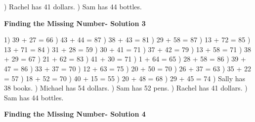 \documentclass{article}%
\begin{document}
) Rachel has 41 dollars.%
) Sam has 44 bottles.%
\newline%
\newpage%
\large%
\begin{center}%
\textbf{Finding the Missing Number- Solution 3}%
\newline%
\end{center} \normalsize%
1) 39 + 27 = 66%
) 43 + 44 = 87%
) 38 + 43 = 81%
) 29 + 58 = 87%
) 13 + 72 = 85%
) 13 + 71 = 84%
) 31 + 28 = 59%
) 30 + 41 = 71%
) 37 + 42 = 79%
) 13 + 58 = 71%
) 38 + 29 = 67%
) 21 + 62 = 83%
) 41 + 30 = 71%
) 1 + 64 = 65%
) 28 + 58 = 86%
) 39 + 47 = 86%
) 33 + 37 = 70%
) 12 + 63 = 75%
) 20 + 50 = 70%
) 26 + 37 = 63%
) 35 + 22 = 57%
) 18 + 52 = 70%
) 40 + 15 = 55%
) 20 + 48 = 68%
) 29 + 45 = 74%
) Sally has 38 books.%
) Michael has 54 dollars.%
) Sam has 52 pens.%
) Rachel has 41 dollars.%
) Sam has 44 bottles.%
\newline%
\newpage%
\large%
\begin{center}%
\textbf{Finding the Missing Number- Solution 4}%
\newline%
\end{center} \normalsize%
\end{document}
